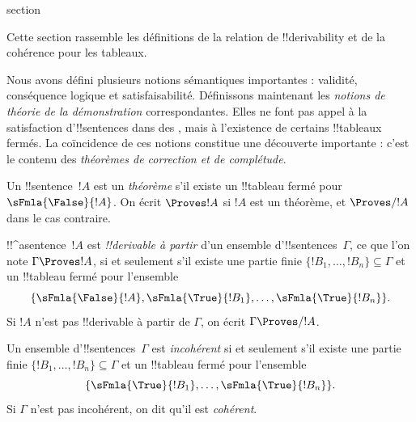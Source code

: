 \documentclass[11pt,a4paper,openany]{memoir}
\begin{document}
\endgroup




\begingroup
\expandafter\def\csname ol@sectioncs\endcsname{section}
\def\olfilename{proof-theoretic-notions}


      {}
      {}
      

\begin{editorial}
Cette section rassemble les définitions de la relation de
!!{derivability} et de la cohérence pour les tableaux.
\end{editorial}

\begin{explain}
Nous avons défini plusieurs notions sémantiques importantes : validité,
conséquence logique et satisfaisabilité. Définissons maintenant les
\emph{notions de théorie de la démonstration} correspondantes. Elles ne
font pas appel à la satisfaction d'!!{sentence}s dans des
, mais à l'existence de
certains !!{tableau}x fermés. La coïncidence de ces
notions constitue une découverte importante : c'est le contenu des
\emph{théorèmes de correction et de complétude}.
\end{explain}


\begin{defn}[Théorèmes]
Un !!{sentence}~$!A$ est un \emph{théorème} s'il existe un
!!{tableau} fermé pour~$\sFmla{\False}{!A}$. On écrit $\Proves !A$
si $!A$ est un théorème, et $\Proves/ !A$ dans le cas contraire.
\end{defn}

\begin{defn}[!!^{derivability}]
!!^a{sentence}~$!A$ est \emph{!!{derivable} à partir} d'un ensemble
d'!!{sentence}s~$\Gamma$, ce que l'on note $\Gamma \Proves !A$,
si et seulement s'il existe une partie finie
$\{!B_1, \dots, !B_n\} \subseteq \Gamma$ et un !!{tableau} fermé
pour l'ensemble
\[
\{
  \sFmla{\False}{!A},
  \sFmla{\True}{!B_1}, \dots,
  \sFmla{\True}{!B_n}
\}.
\]
Si $!A$ n'est pas !!{derivable} à partir de $\Gamma$, on écrit
$\Gamma \Proves/ !A$.
\end{defn}

\begin{defn}[Cohérence]
Un ensemble d'!!{sentence}s~$\Gamma$ est \emph{incohérent} si et
seulement s'il existe une partie finie
$\{!B_1, \dots, !B_n\} \subseteq \Gamma$ et un !!{tableau} fermé
pour l'ensemble
\[
\{
  \sFmla{\True}{!B_1}, \dots,
  \sFmla{\True}{!B_n}  
\}.
\]
Si $\Gamma$ n'est pas incohérent, on dit qu'il est \emph{cohérent}.
\end{defn}
\end{document}
